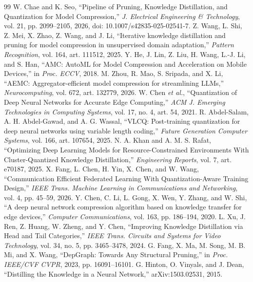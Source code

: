 \documentclass[oneside,a4paper,12pt]{report}
\begin{document}
{\footnotesize\setlength{\itemsep}{0pt}\setlength{\parskip}{0pt}
\begin{thebibliography}{99}
 W. Chae and K. Seo, ``Pipeline of Pruning, Knowledge Distillation, and Quantization for Model Compression,'' \emph{J. Electrical Engineering \& Technology}, vol. 21, pp. 2099--2105, 2026, doi: 10.1007/s42835-025-02541-7.
 Z. Wang, L. Shi, Z. Mei, X. Zhao, Z. Wang, and J. Li, ``Iterative knowledge distillation and pruning for model compression in unsupervised domain adaptation,'' \emph{Pattern Recognition}, vol. 164, art. 111512, 2025.
 Y. He, J. Lin, Z. Liu, H. Wang, L.-J. Li, and S. Han, ``AMC: AutoML for Model Compression and Acceleration on Mobile Devices,'' in \emph{Proc. ECCV}, 2018.
 M. Zhou, R. Mao, S. Sripada, and X. Li, ``AEMC: Aggregator-efficient model compression for streamlining LLMs,'' \emph{Neurocomputing}, vol. 672, art. 132779, 2026.
 W. Chen \emph{et al.}, ``Quantization of Deep Neural Networks for Accurate Edge Computing,'' \emph{ACM J. Emerging Technologies in Computing Systems}, vol. 17, no. 4, art. 54, 2021.
 R. Abdel-Salam, A. H. Abdel-Gawad, and A. G. Wassal, ``VLCQ: Post-training quantization for deep neural networks using variable length coding,'' \emph{Future Generation Computer Systems}, vol. 166, art. 107654, 2025.
 N. A. Khan and A. M. S. Rafat, ``Optimizing Deep Learning Models for Resource-Constrained Environments With Cluster-Quantized Knowledge Distillation,'' \emph{Engineering Reports}, vol. 7, art. e70187, 2025.
 X. Fang, L. Chen, H. Yin, X. Chen, and W. Wang, ``Communication Efficient Federated Learning With Quantization-Aware Training Design,'' \emph{IEEE Trans. Machine Learning in Communications and Networking}, vol. 4, pp. 45--59, 2026.
 Y. Chen, C. Li, L. Gong, X. Wen, Y. Zhang, and W. Shi, ``A deep neural network compression algorithm based on knowledge transfer for edge devices,'' \emph{Computer Communications}, vol. 163, pp. 186--194, 2020.
 L. Xu, J. Ren, Z. Huang, W. Zheng, and Y. Chen, ``Improving Knowledge Distillation via Head and Tail Categories,'' \emph{IEEE Trans. Circuits and Systems for Video Technology}, vol. 34, no. 5, pp. 3465--3478, 2024.
 G. Fang, X. Ma, M. Song, M. B. Mi, and X. Wang, ``DepGraph: Towards Any Structural Pruning,'' in \emph{Proc. IEEE/CVF CVPR}, 2023, pp. 16091--16101.
 G. Hinton, O. Vinyals, and J. Dean, ``Distilling the Knowledge in a Neural Network,'' arXiv:1503.02531, 2015.

\end{thebibliography}}
\end{document}
